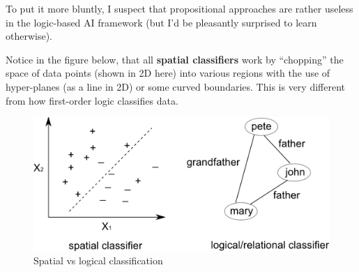 To put it more bluntly, I suspect that propositional approaches are rather useless in the logic-based AI framework (but I'd be pleasantly surprised to learn otherwise).

Notice in the figure below, that all \textbf{spatial classifiers} work by ``chopping'' the space of data points (shown in 2D here) into various regions with the use of hyper-planes (as a line in 2D) or some curved boundaries.  This is very different from how first-order logic classifies data.

\begin{figure}[H]
\centering
\includegraphics{spatial-vs-logical.png}
\caption{Spatial vs logical classification}
\end{figure}

